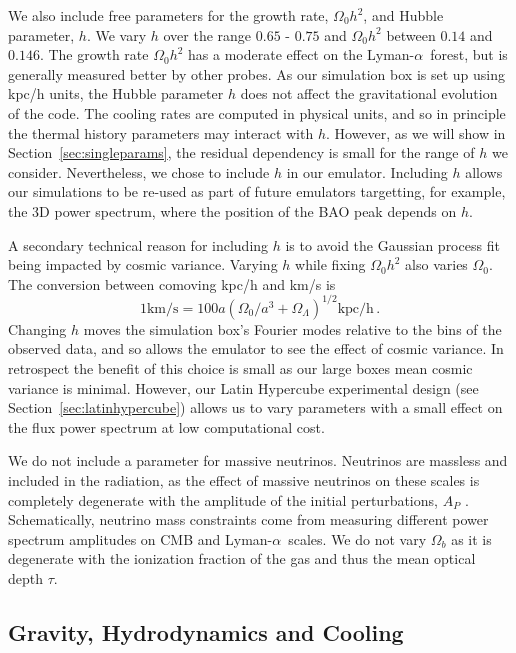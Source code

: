 \documentclass[a4paper,11pt]{article}
\newcommand{\Lya}{Lyman-$\alpha$}
\begin{document}
We also include free parameters for the growth rate, $\Omega_0 h^2$, and Hubble parameter, $h$. We vary $h$ over the range $0.65$ - $0.75$ and $\Omega_0 h^2$ between $0.14$ and $0.146$. The growth rate $\Omega_0 h^2$ has a moderate effect on the \Lya~forest, but is generally measured better by other probes. As our simulation box is set up using kpc/h units, the Hubble parameter $h$ does not affect the gravitational evolution of the code. The cooling rates are computed in physical units, and so in principle the thermal history parameters may interact with $h$. However, as we will show in Section~\ref{sec:singleparams}, the residual dependency is small for the range of $h$ we consider. Nevertheless, we chose to include $h$ in our emulator. Including $h$ allows our simulations to be re-used as part of future emulators targetting, for example, the 3D power spectrum, where the position of the BAO peak depends on $h$.

A secondary technical reason for including $h$ is to avoid the Gaussian process fit being impacted by cosmic variance.
Varying $h$ while fixing $\Omega_0 h^2$ also varies $\Omega_0$. The conversion between comoving kpc/h and km/s is
\begin{equation}
 1 \mathrm{km/s} =  100 a (\Omega_0 /a^3 + \Omega_\Lambda )^{1/2} \mathrm{kpc/h}\,.
\end{equation}
Changing $h$ moves the simulation box's Fourier modes relative to the bins of the observed data, and so allows the emulator to see the effect of cosmic variance. In retrospect the benefit of this choice is small as our large boxes mean cosmic variance is minimal. However, our Latin Hypercube experimental design (see Section~\ref{sec:latinhypercube}) allows us to vary parameters with a small effect on the flux power spectrum at low computational cost.

We do not include a parameter for massive neutrinos. Neutrinos are massless and included in the radiation, as the effect of massive neutrinos on these scales is completely degenerate with the amplitude of the initial perturbations, $A_P$ \cite{Pedersen:2020}.
Schematically, neutrino mass constraints come from measuring different power spectrum amplitudes on CMB and \Lya~scales. We do not vary $\Omega_b$ as it is degenerate with the ionization fraction of the gas and thus the mean optical depth $\tau$.

\subsection{Gravity, Hydrodynamics and Cooling}
\label{sec:gravity}
\end{document}
